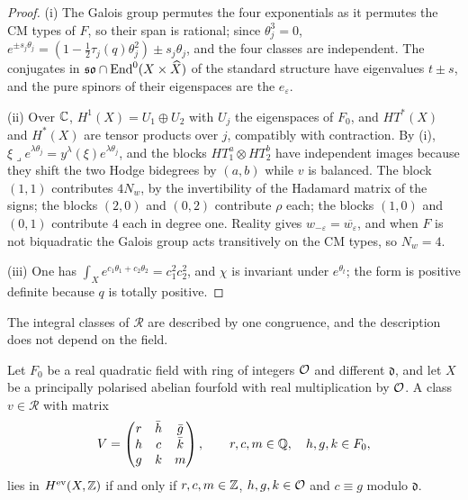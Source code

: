 \begin{proof}
(i) The Galois group permutes the four exponentials as it permutes the CM
types of $F$, so their span is rational; since $\theta_{j}^{3}=0$,
$e^{\pm s_{j}\theta_{j}}=(1-\tfrac12\tau_{j}(q)\theta_{j}^{2})\pm s_{j}\theta_{j}$, and
the four classes are independent. The conjugates in
$\mathfrak{so}\cap\operatorname{End}^{0}(X\times\widehat X)$ of the standard structure have
eigenvalues $t\pm s$, and the pure spinors of their eigenspaces are the
$e_{\varepsilon}$.

(ii) Over $\mathbb{C}$, $H^{1}(X)=U_{1}\oplus U_{2}$ with $U_{j}$ the
eigenspaces of $F_{0}$, and $HT^{*}(X)$ and $H^{*}(X)$ are tensor products over
$j$, compatibly with contraction. By (i),
$\xi\lrcorner e^{\lambda\theta_{j}}=y^{\lambda}(\xi)e^{\lambda\theta_{j}}$, and the
blocks $HT_{1}^{a}\otimes HT_{2}^{b}$ have independent images because they
shift the two Hodge bidegrees by $(a,b)$ while $v$ is balanced. The block
$(1,1)$ contributes $4N_{w}$, by the invertibility of the Hadamard matrix of
the signs; the blocks $(2,0)$ and $(0,2)$ contribute $\rho$ each; the blocks
$(1,0)$ and $(0,1)$ contribute $4$ each in degree one. Reality gives
$w_{-\varepsilon}=\overline{w_{\varepsilon}}$, and when $F$ is not biquadratic
the Galois group acts transitively on the CM types, so $N_{w}=4$.

(iii) One has
$\int_{X}e^{c_{1}\theta_{1}+c_{2}\theta_{2}}=c_{1}^{2}c_{2}^{2}$, and $\chi$ is
invariant under $e^{\theta_{t}}$; the form is positive definite because $q$ is
totally positive.
\end{proof}

The integral classes of $\mathcal{R}$ are described by one congruence, and
the description does not depend on the field.

\begin{lemma}\label{lem:quarticlattice}
Let $F_{0}$ be a real quadratic field with ring of integers $\mathcal{O}$ and
different $\mathfrak d$, and let $X$ be a principally polarised abelian
fourfold with real multiplication by $\mathcal{O}$. A class $v\in\mathcal{R}$ with
matrix
\[
  V=\begin{pmatrix}r&\bar h&\bar g\\ h&c&\bar k\\ g&k&m\end{pmatrix},
  \qquad r,c,m\in\mathbb{Q},\quad h,g,k\in F_{0},
\]
lies in $H^{\mathrm{ev}}(X,\mathbb{Z})$ if and only if $r,c,m\in\mathbb{Z}$,
$h,g,k\in\mathcal{O}$ and $c\equiv g$ modulo $\mathfrak d$.
\end{lemma}

